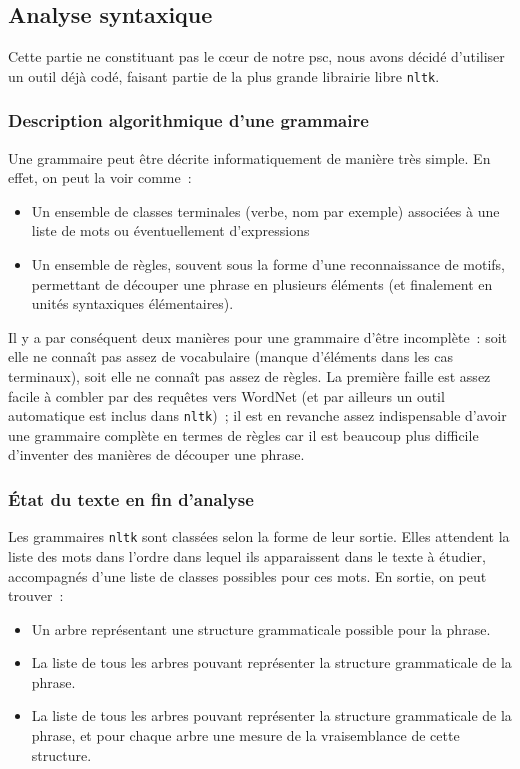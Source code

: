 \documentclass[a4paper, 12pt]{article}
\newcommand{\pyt}[1]{\texttt{#1}}%
\begin{document}
\subsection{Analyse syntaxique}

Cette partie ne constituant pas le c\oe{}ur de notre psc, nous avons décidé d'utiliser un outil déjà codé, faisant partie de la plus grande librairie libre \pyt{nltk}.

\subsubsection{Description algorithmique d'une grammaire}
Une grammaire peut être décrite informatiquement de manière très simple. En effet, on peut la voir comme~:
\begin{itemize}
	\item Un ensemble de classes terminales (verbe, nom par exemple) associées à une liste de mots ou éventuellement d'expressions
	\item Un ensemble de règles, souvent sous la forme d'une reconnaissance de motifs, permettant de découper une phrase en plusieurs éléments (et finalement en unités syntaxiques élémentaires).
\end{itemize}

Il y a par conséquent deux manières pour une grammaire d'être incomplète~: soit elle ne connaît pas assez de vocabulaire (manque d'éléments dans les cas terminaux), soit elle ne connaît pas assez de règles. La première faille est assez facile à combler par des requêtes vers WordNet (et par ailleurs un outil automatique est inclus dans \pyt{nltk})~; il est en revanche assez indispensable d'avoir une grammaire complète en termes de règles car il est beaucoup plus difficile d'inventer des manières de découper une phrase.

\subsubsection{\'Etat du texte en fin d'analyse}
Les grammaires \pyt{nltk} sont classées selon la forme de leur sortie. Elles attendent la liste des mots dans l'ordre dans lequel ils apparaissent dans le texte à étudier, accompagnés d'une liste de classes possibles pour ces mots. En sortie, on peut trouver~:

\begin{itemize}
	\item Un arbre représentant une structure grammaticale possible pour la phrase.
	\item La liste de tous les arbres pouvant représenter la structure grammaticale de la phrase.
	\item La liste de tous les arbres pouvant représenter la structure grammaticale de la phrase, et pour chaque arbre une mesure de la vraisemblance de cette structure.
\end{itemize}
\end{document}
